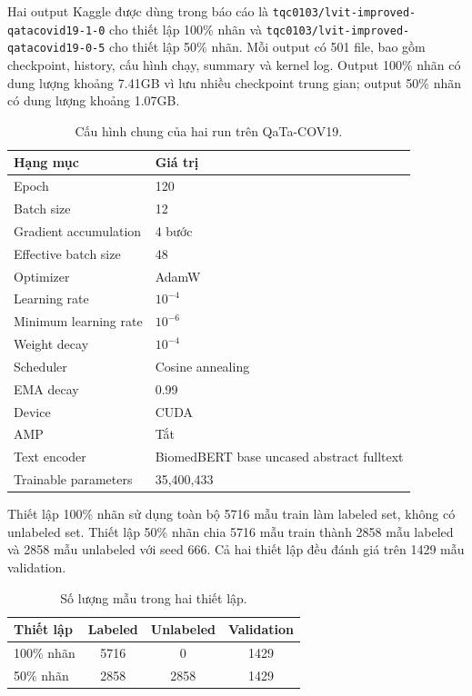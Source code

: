 Hai output Kaggle được dùng trong báo cáo là \texttt{tqc0103/lvit-improved-qatacovid19-1-0} cho thiết lập 100\% nhãn và \texttt{tqc0103/lvit-improved-qatacovid19-0-5} cho thiết lập 50\% nhãn. Mỗi output có 501 file, bao gồm checkpoint, history, cấu hình chạy, summary và kernel log. Output 100\% nhãn có dung lượng khoảng 7.41GB vì lưu nhiều checkpoint trung gian; output 50\% nhãn có dung lượng khoảng 1.07GB.

\begin{table}[t]
  \centering
  \caption{Cấu hình chung của hai run trên QaTa-COV19.}
  \label{tab:run-config}
  \scriptsize
  \begin{tabularx}{\columnwidth}{lX}
    \toprule
    Hạng mục & Giá trị \\
    \midrule
    Epoch & 120 \\
    Batch size & 12 \\
    Gradient accumulation & 4 bước \\
    Effective batch size & 48 \\
    Optimizer & AdamW \\
    Learning rate & $10^{-4}$ \\
    Minimum learning rate & $10^{-6}$ \\
    Weight decay & $10^{-4}$ \\
    Scheduler & Cosine annealing \\
    EMA decay & 0.99 \\
    Device & CUDA \\
    AMP & Tắt \\
    Text encoder & BiomedBERT base uncased abstract fulltext \\
    Trainable parameters & 35,400,433 \\
    \bottomrule
  \end{tabularx}
\end{table}

Thiết lập 100\% nhãn sử dụng toàn bộ 5716 mẫu train làm labeled set, không có unlabeled set. Thiết lập 50\% nhãn chia 5716 mẫu train thành 2858 mẫu labeled và 2858 mẫu unlabeled với seed 666. Cả hai thiết lập đều đánh giá trên 1429 mẫu validation.

\begin{table}[t]
  \centering
  \caption{Số lượng mẫu trong hai thiết lập.}
  \label{tab:data-split}
  \scriptsize
  \begin{tabular}{lccc}
    \toprule
    Thiết lập & Labeled & Unlabeled & Validation \\
    \midrule
    100\% nhãn & 5716 & 0 & 1429 \\
    50\% nhãn & 2858 & 2858 & 1429 \\
    \bottomrule
  \end{tabular}
\end{table}


